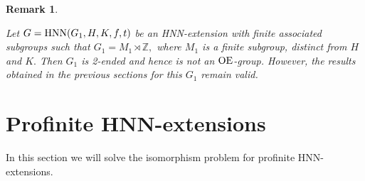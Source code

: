 \documentclass[a4paper,12pt]{article}
\newcommand{\Z}{\mathbb{Z}}
\def\OE{{\rm OE}}
\def\hnn {{\rm HNN}}
\def\Iso {{\rm Iso}}
\def\Z{{\mathbb Z}}
\newtheorem{exa}[thm]{Example}
\newtheorem{rem}[thm]{Remark}
\begin{document}
{%

\begin{rem} \label{finite-by-cyclic} 
 
Let $G=\hnn(G_1, H, K, f, t)$ be an HNN-extension with finite associated subgroups such that $G_1=M_1\rtimes \Z,$ where $M_1$ is a finite subgroup, distinct from $H$ and $K.$ %
Then $G_1$ is 2-ended and hence is not an $\OE$-group. %
However, the results obtained in the previous sections for this $G_1$ remain valid.\end{rem}

\section{Profinite HNN-extensions} \label{secao 4}
\label{profinitehnnextensions}


In this section we will solve the isomorphism problem for profinite HNN-extensions.  %

}
\end{document}
